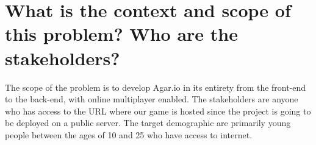 \documentclass{article}
\begin{document}
\section*{What is the context and scope of this problem? Who are the stakeholders?} 
The scope of the problem  is to develop Agar.io in its entirety from the front-end to the back-end, with online multiplayer enabled.  
The stakeholders are anyone who has access to the URL where our game is hosted since the project is going to be deployed on a public server. The target demographic are primarily young people between the ages of 10 and 25 who have access to internet. 
\end{document}
